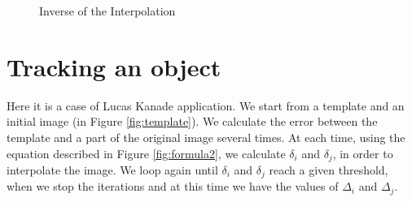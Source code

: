 \documentclass{article}
\begin{document}
	\begin{figure}[H]
		  \centering
		  \hspace{0.1cm}
		  \hspace{0.1cm}
		  \caption{Inverse of the Interpolation}
		  \label{fig:inverseinterp}
	\end{figure}	



\section{Tracking an object}

	Here it is a case of Lucas Kanade application. We start from a template and an initial image (in Figure \ref{fig:template}). We calculate the error between the template and a part of the original image several times. At each time, using the equation described in Figure \ref{fig:formula2}, we calculate $\delta_i$ and $\delta_j$, in order to interpolate the image. We loop again until $\delta_i$ and $\delta_j$ reach a given threshold, when we stop the iterations and at this time we have the values of $\Delta_i$ and $\Delta_j$. 
\end{document}
